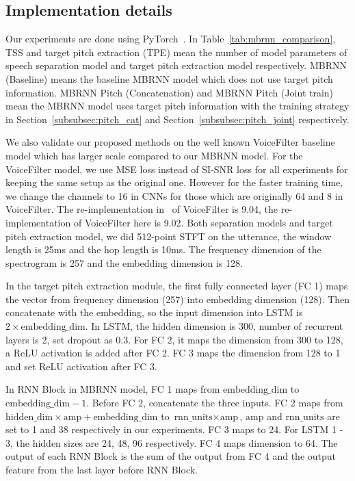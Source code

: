 \documentclass[
]{article}
\begin{document}
    \subsection{Implementation details}
    \label{subsec:implement}

    Our experiments are done using PyTorch~\cite{NEURIPS2019_bdbca288}.
    In Table~\ref{tab:mbrnn_comparison}, TSS and target pitch extraction (TPE) mean the number of model parameters of speech separation model and target pitch extraction model respectively.
    MBRNN (Baseline) means the baseline MBRNN model which does not use target pitch information. MBRNN Pitch (Concatenation) and MBRNN Pitch (Joint train) mean the MBRNN model uses target pitch information with the training strategy in Section~\ref{subsubsec:pitch_cat} and Section~\ref{subsubsec:pitch_joint} respectively.

    We also validate our proposed methods on the well known VoiceFilter baseline model which has larger scale compared to our MBRNN model. For the VoiceFilter model, we use MSE loss instead of SI-SNR loss for all experiments for keeping the same setup as the original one. However for the faster training time, we change the channels to 16 in CNNs for those which are originally 64 and 8 in VoiceFilter. The re-implementation in~\cite{li20p_interspeech} of VoiceFilter is 9.04, the re-implementation of VoiceFilter here is 9.02.
    Both separation models and target pitch extraction model, we did 512-point STFT on the utterance, the window length is 25ms and the hop length is 10ms. The frequency dimension of the spectrogram is 257 and the embedding dimension is 128.

    In the target pitch extraction module, the first fully connected layer (FC 1) maps the vector from frequency dimension (257) into embedding dimension (128). Then concatenate with the embedding, so the input dimension into LSTM is $2\times \text{embedding\_dim}$. In LSTM, the hidden dimension is 300, number of recurrent layers is 2, set dropout as 0.3. For FC 2, it maps the dimension from 300 to 128, a ReLU activation is added after FC 2. FC 3 maps the dimension from 128 to 1 and set ReLU activation after FC 3.

    In RNN Block in MBRNN model, FC 1 maps from $\text{embedding\_dim}$ to $\text{embedding\_dim} - 1$. Before FC 2, concatenate the three inputs. FC 2 maps from $\text{hidden\_dim}\times\text{amp} + \text{embedding\_dim}$ to $\text{rnn\_units}\times\text{amp}$, $\text{amp}$ and $\text{rnn\_units}$ are set to 1 and 38 respectively in our experiments. FC 3 maps to 24. For LSTM 1 - 3, the hidden sizes are 24, 48, 96 respectively. FC 4 maps dimension to 64. The output of each RNN Block is the sum of the output from FC 4 and the output feature from the last layer before RNN Block.
\end{document}
